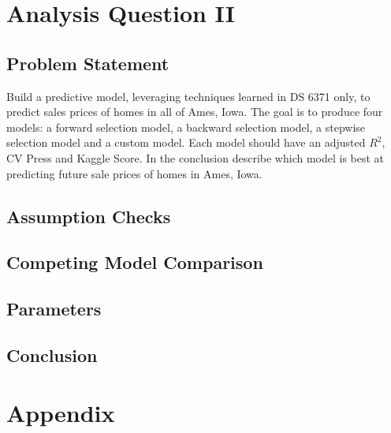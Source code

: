\documentclass[american,]{article}
\begin{document}
\citet{Sleuth}

\citet{Pearl2009}

\citet{Ruppert2015}

\section{Analysis Question II}\label{analysis-question-ii}

\subsection{Problem Statement}\label{problem-statement-1}

Build a predictive model, leveraging techniques learned in DS 6371 only,
to predict sales prices of homes in all of Ames, Iowa. The goal is to
produce four models: a forward selection model, a backward selection
model, a stepwise selection model and a custom model. Each model should
have an adjusted \(R^{2}\), CV Press and Kaggle Score. In the conclusion
describe which model is best at predicting future sale prices of homes
in Ames, Iowa.

\subsection{Assumption Checks}\label{assumption-checks}

\subsection{Competing Model
Comparison}\label{competing-model-comparison-1}

\subsection{Parameters}\label{parameters-1}

\subsection{Conclusion}\label{conclusion-1}

\citet{Hastie2009} \citet{Trefethen1997}

\section{Appendix}\label{appendix}

\renewcommand\refname{References}

\end{document}
